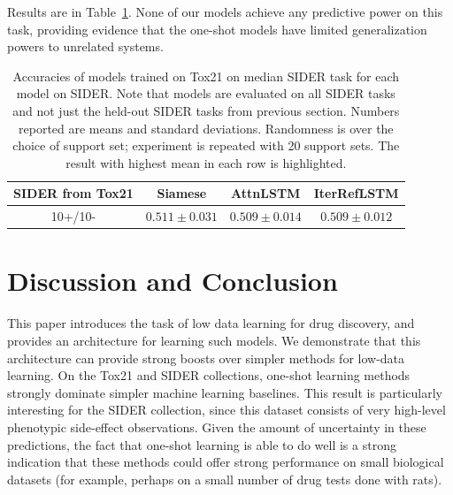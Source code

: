 \documentclass[journal=jacsat,manuscript=article]{achemso}
\begin{document}
Results are in Table~\ref{tab:transfer}. None of our models achieve any predictive power on this task, providing evidence that the one-shot models have limited generalization powers to unrelated systems.

\begin{table}
    \centering
    \begin{tabular}{ |c|c|c|c| } 
    \hline
    SIDER from Tox21 & Siamese & AttnLSTM & IterRefLSTM \\ 
    \hline
    10+/10- & $0.511 \pm 0.031$ & $0.509 \pm 0.014$ & $0.509 \pm 0.012$ \\
    \hline
    \end{tabular}
    \caption{Accuracies of models trained on Tox21 on median SIDER task for each model on SIDER. Note that models are evaluated on all SIDER tasks and not just the held-out SIDER tasks from previous section. Numbers reported are means and standard deviations. Randomness is over the choice of support set; experiment is repeated with 20 support sets. The result with highest mean in each row is highlighted.}
    \label{tab:transfer}
\end{table}

\section{Discussion and Conclusion}

This paper introduces the task of low data learning for drug discovery, and provides an architecture for learning such models. We demonstrate that this architecture can provide strong boosts over simpler methods for low-data learning. On the Tox21 and SIDER collections, one-shot learning methods strongly dominate simpler machine learning baselines. This result is particularly interesting for the SIDER collection, since this dataset consists of very high-level phenotypic side-effect observations. Given the amount of uncertainty in these predictions, the fact that one-shot learning is able to do well is a strong indication that these methods could offer strong performance on small biological datasets (for example, perhaps on a small number of drug tests done with rats).
\end{document}
